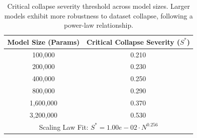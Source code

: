 \begin{table}[h]
\centering
\begin{tabular}{cc}
\toprule
\textbf{Model Size (Params)} & \textbf{Critical Collapse Severity ($S^*$)} \\
\midrule
100,000 & 0.210 \\
200,000 & 0.230 \\
400,000 & 0.250 \\
800,000 & 0.290 \\
1,600,000 & 0.370 \\
3,200,000 & 0.530 \\
\midrule
\multicolumn{2}{c}{Scaling Law Fit: $S^* = 1.00e-02 \cdot N^{0.256}$} \\
\bottomrule
\end{tabular}
\vspace{0.2cm}
\caption{Critical collapse severity threshold across model sizes. Larger models exhibit more robustness to dataset collapse, following a power-law relationship.}
\label{tab:scaling_thresholds}
\end{table}